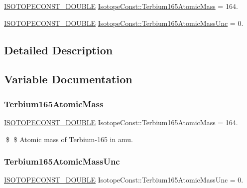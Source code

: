 \begin{DoxyCompactItemize}
\item 
\mbox{\hyperlink{group___isotope_const-_macros_ga8f45a7272ce02c0b4c65c44636ed719a}{I\+S\+O\+T\+O\+P\+E\+C\+O\+N\+S\+T\+\_\+\+D\+O\+U\+B\+LE}} \mbox{\hyperlink{group___isotope_const-_terbium-_tb165_gab894d0e026732ed2df86b6759b4d637b}{Isotope\+Const\+::\+Terbium165\+Atomic\+Mass}} = 164.
\item 
\mbox{\hyperlink{group___isotope_const-_macros_ga8f45a7272ce02c0b4c65c44636ed719a}{I\+S\+O\+T\+O\+P\+E\+C\+O\+N\+S\+T\+\_\+\+D\+O\+U\+B\+LE}} \mbox{\hyperlink{group___isotope_const-_terbium-_tb165_ga751df873354cc3864f8b4e6f10b8d816}{Isotope\+Const\+::\+Terbium165\+Atomic\+Mass\+Unc}} = 0.
\end{DoxyCompactItemize}


\subsection{Detailed Description}


\subsection{Variable Documentation}
\mbox{\label{group___isotope_const-_terbium-_tb165_gab894d0e026732ed2df86b6759b4d637b}} 
\subsubsection{\texorpdfstring{Terbium165\+Atomic\+Mass}{Terbium165AtomicMass}}
{\footnotesize\ttfamily \mbox{\hyperlink{group___isotope_const-_macros_ga8f45a7272ce02c0b4c65c44636ed719a}{I\+S\+O\+T\+O\+P\+E\+C\+O\+N\+S\+T\+\_\+\+D\+O\+U\+B\+LE}} Isotope\+Const\+::\+Terbium165\+Atomic\+Mass = 164.}

\$ \$ Atomic mass of Terbium-\/165 in amu. \mbox{\label{group___isotope_const-_terbium-_tb165_ga751df873354cc3864f8b4e6f10b8d816}} 
\subsubsection{\texorpdfstring{Terbium165\+Atomic\+Mass\+Unc}{Terbium165AtomicMassUnc}}
{\footnotesize\ttfamily \mbox{\hyperlink{group___isotope_const-_macros_ga8f45a7272ce02c0b4c65c44636ed719a}{I\+S\+O\+T\+O\+P\+E\+C\+O\+N\+S\+T\+\_\+\+D\+O\+U\+B\+LE}} Isotope\+Const\+::\+Terbium165\+Atomic\+Mass\+Unc = 0.}

